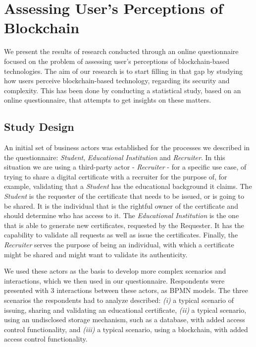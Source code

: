 \section{Assessing User's Perceptions of Blockchain}

We present the results of research conducted through an online questionnaire focused on the problem of assessing user's perceptions of blockchain-based technologies. The aim of our research is to start filling in that gap by studying how users perceive blockchain-based technology, regarding its security and complexity. This has been done by conducting a statistical study, based on an online questionnaire, that attempts to get insights on these matters. 

\subsection{Study Design}

An initial set of business actors was established for the processes we described in the questionnaire: \textit{Student}, \textit{Educational Institution} and \textit{Recruiter}. In this situation we are using a third-party actor - \textit{Recruiter} - for a specific use case, of trying to share a digital certificate with a recruiter for the purpose of, for example, validating that a \textit{Student} has the educational background it claims. The \textit{Student} is the requester of the certificate that needs to be issued, or is going to be shared. It is the individual that is the rightful owner of the certificate and should determine who has access to it. The \textit{Educational Institution} is the one that is able to generate new certificates, requested by the Requester. It has the capability to validate all requests as well as issue the certificates. Finally, the \textit{Recruiter} serves the purpose of being an individual, with which a certificate might be shared and might want to validate its authenticity.

We used these actors as the basis to develop more complex scenarios and interactions, which we then used in our questionnaire. Respondents were presented with 3 interactions between these actors, as BPMN \cite{BPMN} models. The three scenarios the respondents had to analyze described: \emph{(i)} a typical scenario of issuing, sharing and validating an educational certificate, \emph{(ii)} a typical scenario, using an undisclosed storage mechanism, such as a database, with added access control functionality, and \emph{(iii)} a typical scenario, using a blockchain, with added access control functionality.

